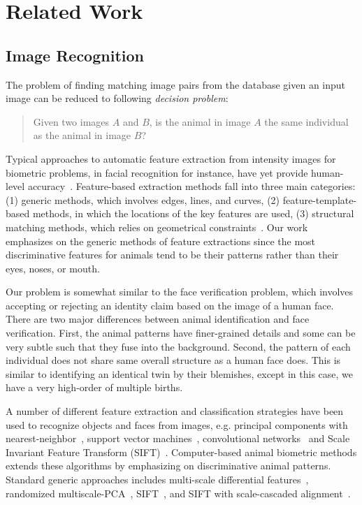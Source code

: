 \graphicspath{{images/chap2/}}
\chapter{Related Work} %
\label{cha:related_work}

\section{Image Recognition}

The problem of finding matching image pairs from the database given an input
image can be reduced to following \emph{decision problem}:
\begin{quote}
\centering
Given two images $A$ and $B$, is the animal in image $A$ the same
individual as the animal in image $B$?
\end{quote}

Typical approaches to automatic feature extraction from intensity images for
biometric problems, in facial recognition for instance, have yet provide
human-level accuracy~\cite{facesurvey03,facerec97}.  Feature-based extraction
methods fall into three main categories: (1) generic methods, which involves
edges, lines, and curves, (2) feature-template-based methods, in which the
locations of the key features are used, (3) structural matching methods, which
relies on geometrical constraints~\cite{facesurvey03}.  Our work emphasizes on
the generic methods of feature extractions since the most discriminative
features for animals tend to be their patterns rather than their eyes, noses, or
mouth.

Our problem is somewhat similar to the face verification problem, which involves
accepting or rejecting an identity claim based on the image of a human face.
There are two major differences between animal identification and face
verification. First, the animal patterns have finer-grained details and some can
be very subtle such that they fuse into the background. Second, the pattern of
each individual does not share same overall structure as a human face does. This
is similar to identifying an identical twin by their blemishes, except in this
case, we have a very high-order of multiple births.

A number of different feature extraction and classification strategies have been
used to recognize objects and faces from images, e.g. principal components with
nearest-neighbor~\cite{object91,object95,shape00}, support vector
machines~\cite{object97}, convolutional networks~\cite{object98} and Scale
Invariant Feature Transform (SIFT)~\cite{lowe04}. Computer-based animal
biometric methods extends these algorithms by emphasizing on discriminative
animal patterns. Standard generic approaches includes multi-scale differential
features~\cite{gamble08,ravela02,sloop13}, randomized
multiscale-PCA~\cite{ravela04}, SIFT~\cite{town13,sloop13}, and SIFT with
scale-cascaded alignment~\cite{yang09}.

